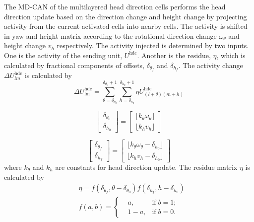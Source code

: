 The MD-CAN of the multilayered head direction cells performs the head direction update based on the direction change and height change by projecting activity from the current activated cells into nearby cells. 
The activity is shifted in yaw and height matrix according to the rotational direction change $\omega_\theta$ and height change $v_h$ respectively. 
The activity injected is determined by two inputs. 
One is the activity of the sending unit, $U^{\text{hdc}}$. 
Another is the residue, $\eta$, which is calculated by fractional components of offsets, $\delta_{\theta _f}$ and $\delta_{h_f}$. 
The activity change $\Delta U_{lm}^{\text{hdc}}$ is calculated by
\begin{equation}
	\Delta U_\text{lm}^{\text{hdc}} = 
		\sum_{\theta = \delta_{\theta_0}}^{\delta_{\theta_0}+1}
		\sum_{h=\delta_{h_0}}^{\delta_{h_0}+1}
		\eta
		U_{(l+\theta) (m+h)} ^\text{hdc}
\end{equation}


\begin{equation}
	\left[
		\begin{matrix}
			\delta_{\theta_0} \\
			\delta_{h_0}
		\end{matrix}
	\right]
	=
	\left[
		\begin{matrix}
			\lfloor k_\theta \omega_\theta \rfloor \\
			\lfloor k_h v_h \rfloor
		\end{matrix}
	\right]
\end{equation}


\begin{equation}
	\left[
		\begin{matrix}
			\delta_{\theta_f} \\
			\delta_{h_f}
		\end{matrix}
	\right]
	=
	\left[
		\begin{matrix}
			\lfloor k_\theta \omega_\theta - \delta_{h_0} \rfloor \\
			\lfloor k_h v_h - \delta_{h_0} \rfloor
		\end{matrix}
	\right]
\end{equation}
where $k_\theta$ and $k_h$ are constants for head direction update. 
The residue matrix $\eta$ is calculated by
\begin{equation}
	\begin{aligned}
		& \eta = 
			f(\delta_{\theta_f}, \theta - \delta_{\theta_0})
			f(\delta_{h_f}, h-\delta_{h_0}) \\
		& f(a,b) = 
		\left\{
		\begin{aligned}
			& a,  & \text{if} \; b=1;\\
			& 1-a, & \text{if} \; b=0.
		\end{aligned}
		\right.
	\end{aligned}
\end{equation}


